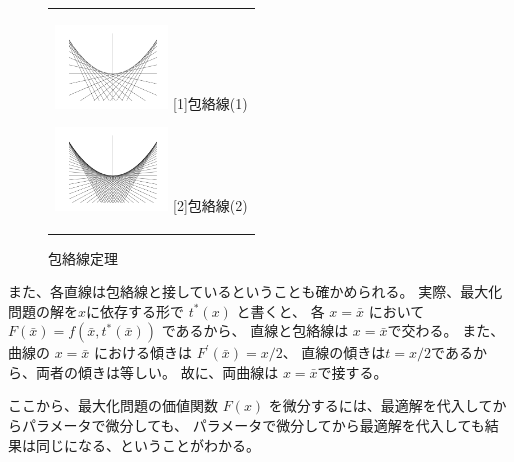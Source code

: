 \documentclass[11pt,a4j,fleqn]{jarticle}
\begin{document}
\begin{figure}[htbp]
  \begin{center}
    \begin{tabular}{c}

      \begin{minipage}{0.33\hsize}
        \begin{center}
          \includegraphics[bb=0 0 240 180 , width=3cm]{envelope1.png}
          \hspace{1.6cm} [1]包絡線(1)
        \end{center}
      \end{minipage}

      \begin{minipage}{0.33\hsize}
        \begin{center}
          \includegraphics[bb=0 0 240 180 , width=3cm]{envelope0.png}
          \hspace{1.6cm} [2]包絡線(2)
        \end{center}
      \end{minipage}

    \end{tabular}
    \caption{包絡線定理}
    \label{envelope}
  \end{center}
\end{figure}

また、各直線は包絡線と接しているということも確かめられる。
実際、最大化問題の解を$x$に依存する形で $t^*(x)$ と書くと、
各 $x = \bar{x}$ において $F(\bar{x}) = f(\bar{x} , t^*(\bar{x}))$ であるから、
直線と包絡線は $x = \bar{x}$で交わる。
また、曲線の $x = \bar{x}$ における傾きは $F^{'}(\bar{x}) = x/2$、
直線の傾きは$t = x/2$であるから、両者の傾きは等しい。
故に、両曲線は $x = \bar{x}$で接する。

\vspace{0.3cm}

ここから、最大化問題の価値関数 $F(x)$ を微分するには、最適解を代入してからパラメータで微分しても、
パラメータで微分してから最適解を代入しても結果は同じになる、ということがわかる。
\end{document}
